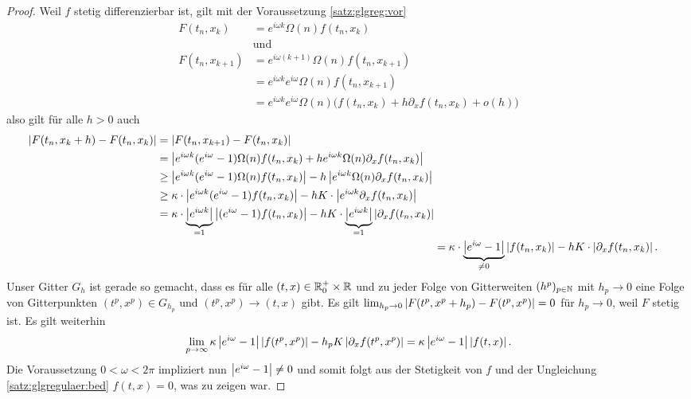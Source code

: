 \begin{proof}
Weil $f$ stetig differenzierbar ist, gilt mit der Voraussetzung \eqref{satz:glgreg:vor}
\begin{align*}
F(t_n, x_k) &= e^{i \omega k} \Omega(n) f(t_n, x_k)\\
&\text{und}\\
F(t_n, x_{k+1}) &= e^{i \omega (k + 1)} \Omega(n) f(t_n, x_{k+1})\\
&= e^{i \omega k} e^{i \omega} \Omega(n) f(t_n, x_{k+1})\\
&= e^{i \omega k} e^{i \omega} \Omega(n) \bigl( f(t_n, x_k) + h \partial_x f(t_n, x_k) + o(h) \bigr)
\end{align*}
also gilt für alle $h > 0$ auch
\begin{align}
\begin{split}\nonumber
\left| F(t_n, x_k + h) - F(t_n, x_k) \right| &= \left| F(t_n, x_{k+1}) - F(t_n, x_k) \right|\\
&= \left| e^{i \omega k} (e^{i \omega} - 1) \Omega(n) f(t_n, x_k) + h e^{i \omega k} \Omega(n) \partial_x f(t_n, x_k) \right|\\
&\geq \left|  e^{i \omega k} (e^{i \omega} - 1) \Omega(n) f(t_n, x_k)  \right|  - h  \left|  e^{i \omega k} \Omega(n) \partial_x f(t_n, x_k)  \right|\\
&\geq \kappa \cdot \left|  e^{i \omega k} (e^{i \omega} - 1) f(t_n, x_k)  \right|  - h  K \cdot \left|  e^{i \omega k} \partial_x f(t_n, x_k)  \right|\\
&= \kappa \cdot \underbrace{\left|  e^{i \omega k}  \right|}_{= 1} \left|  (e^{i \omega} - 1) f(t_n, x_k)  \right| - hK \cdot  \underbrace{\left|  e^{i \omega k}  \right|}_{= 1} \left|  \partial_x f(t_n, x_k)  \right|
\end{split}\\ \label{satz:glgregulaer:bed}
&= \kappa \cdot \underbrace{\left| e^{i \omega} - 1 \right|}_{\neq 0} \left| f(t_n, x_k) \right| - hK \cdot \left| \partial_x f(t_n, x_k) \right|.
\end{align}
Unser Gitter $G_h$ ist gerade so gemacht, dass es für alle $(t,x) \in \mathbb R^+_0 \times \mathbb R$ und zu jeder Folge von Gitterweiten $(h^p)_{p \in \mathbb N}$ mit $h_p \to 0$ eine Folge von Gitterpunkten $(t^p, x^p) \in G_{h_p}$ und $(t^p, x^p) \to (t,x)$ gibt.
Es gilt $\lim_{h_p \to 0} \left| F(t^p, x^p + h_p) - F(t^p, x^p) \right| = 0$ für $h_p \to 0$, weil $F$ stetig ist.
Es gilt weiterhin
\[ \lim_{p \to \infty} \kappa \left| e^{i \omega} - 1 \right| \left| f(t^p, x^p) \right| - h_pK \left| \partial_x f(t^p, x^p) \right| = \kappa \left| e^{i \omega} - 1 \right| \left| f(t, x) \right|. \]
Die Voraussetzung $0 < \omega < 2 \pi$ impliziert nun $\left| e^{i \omega} - 1 \right| \neq 0$ und somit folgt aus der Stetigkeit von $f$ und der Ungleichung \eqref{satz:glgregulaer:bed} $f(t,x) = 0$, was zu zeigen war.
\end{proof}

